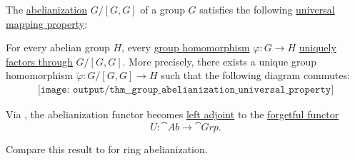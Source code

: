 \begin{theorem}\label{thm:group_abelianization_universal_property}
  The \hyperref[def:group_abelianization]{abelianization} \( G / [G, G] \) of a group \( G \) satisfies the following \hyperref[rem:universal_mapping_property]{universal mapping property}:
  \begin{displayquote}
    For every abelian group \( H \), every \hyperref[def:group/homomorphism]{group homomorphism} \( \varphi: G \to H \) \hyperref[def:factors_through]{uniquely factors through} \( G / [G, G] \). More precisely, there exists a unique group homomorphism \( \widetilde{\varphi}: G / [G, G] \to H \) such that the following diagram commutes:
    \begin{equation}\label{eq:thm:group_abelianization_universal_property/diagram}
      \begin{aligned}
        \texttt{[image: output/thm\_\_group\_abelianization\_universal\_property]}
      \end{aligned}
    \end{equation}
  \end{displayquote}
\end{theorem}
\begin{comments}
  \item Via , the abelianization functor becomes \hyperref[def:category_adjunction]{left adjoint} to the \hyperref[def:concrete_category]{forgetful functor}
  \begin{equation*}
    U: \cat{Ab} \to \cat{Grp}.
  \end{equation*}

  \item Compare this result to  for ring abelianization.
\end{comments}
